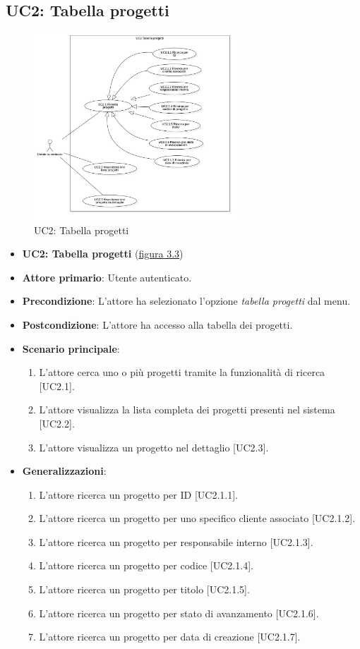 \subsection{UC2: Tabella progetti}
\begin{figure}[!h]
\centering
\includegraphics[width=290px]{../images/UC/.jpeg/UC2.0-tabellaProgetti.jpg}
\caption{UC2: Tabella progetti}
\label{fig:UC2}
\end{figure}

\pagebreak

\begin{itemize}
\item \textbf{UC2: Tabella progetti} ({\hyperref[fig:UC2]{figura 3.3}})
\item \textbf{Attore primario}: Utente autenticato.
\item \textbf{Precondizione}: L'attore ha selezionato l'opzione \textit{tabella progetti} dal menu.
\item \textbf{Postcondizione}: L'attore ha accesso alla tabella dei progetti.
\item \textbf{Scenario principale}: 
\begin{enumerate}
\item L'attore cerca uno o più progetti tramite la funzionalità di ricerca [UC2.1].
\item L'attore visualizza la lista completa dei progetti presenti nel sistema [UC2.2].
\item L'attore visualizza un progetto nel dettaglio [UC2.3].
\end{enumerate}
\item \textbf{Generalizzazioni}:
\begin{enumerate}
\item L'attore ricerca un progetto per ID [UC2.1.1].
\item L'attore ricerca un progetto per uno specifico cliente associato [UC2.1.2].
\item L'attore ricerca un progetto per responsabile interno [UC2.1.3].
\item L'attore ricerca un progetto per codice [UC2.1.4].
\item L'attore ricerca un progetto per titolo [UC2.1.5].
\item L'attore ricerca un progetto per stato di avanzamento [UC2.1.6].
\item L'attore ricerca un progetto per data di creazione [UC2.1.7].
\end{enumerate}
\end{itemize}

